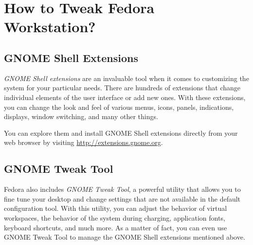 \section*{How to Tweak Fedora Workstation?}
\subsection*{GNOME Shell Extensions}

\emph{GNOME Shell extensions} are an invaluable tool when it comes to customizing the system for your particular needs. There are hundreds of extensions that change individual elements of the user interface or add new ones. With these extensions, you can change the look and feel of various menus, icons, panels, indications, displays, window switching, and many other things.

You can explore them and install GNOME Shell extensions directly from your web browser by visiting \url{http://extensions.gnome.org}.

\subsection*{GNOME Tweak Tool}

Fedora also includes \emph{GNOME Tweak Tool}, a powerful utility that allows you to fine tune your desktop and change settings that are not available in the default configuration tool. With this utility, you can adjust the behavior of virtual workspaces, the behavior of the system during charging, application fonts, keyboard shortcuts, and much more. As a matter of fact, you can even use GNOME Tweak Tool to manage the GNOME Shell extensions mentioned above.
\endinput
